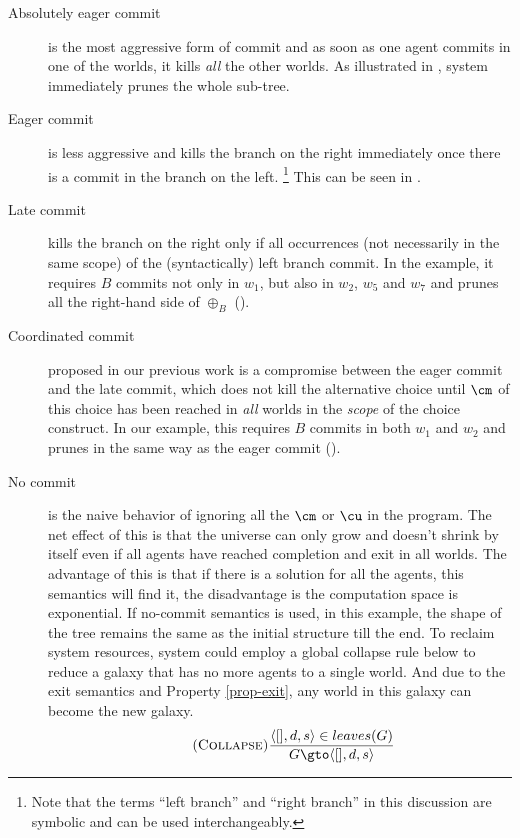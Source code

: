 \begin{description}
  \item[Absolutely eager commit] is the most aggressive form of commit and
as soon as one agent commits in one of the worlds,
it kills {\em all} the other worlds. As illustrated in
, system immediately prunes the whole sub-tree.

  \item[Eager commit] is less aggressive and kills the branch on the right
immediately once there is a commit in the branch on the left.
\footnote{Note that the terms ``left branch'' and ``right branch'' in this
discussion are symbolic and can be used interchangeably.}
This can be seen in .

  \item[Late commit] kills the branch on the right only if all occurrences
(not necessarily in the same scope) of the (syntactically) left branch commit.
In the example, it requires $B$ commits not only in $w_1$,
but also in $w_2$, $w_5$ and $w_7$ and prunes all the right-hand side of
$\oplus_B$ ().

  \item[Coordinated commit] proposed in our previous work \cite{JaffarYZ07}
is a compromise between the eager commit and the late commit, which does not
kill the alternative choice until $\cm$ of this choice has been reached in
\emph{all} worlds in the {\em scope} of the choice construct.
In our example, this requires $B$ commits in both $w_1$ and $w_2$ and prunes
in the same way as the eager commit ().

  \item[No commit] is the naive behavior of ignoring all the $\cm$ or $\cu$
in the program. The net effect of this is that the universe can only grow and
doesn't shrink by itself even if all agents have reached completion and exit in all worlds.
The advantage of this is that if there is a solution for all the agents, this semantics
will find it, the disadvantage is the computation space is exponential.
If no-commit semantics is used, in this example, the shape of the tree
remains the same as the initial structure till the end.
To reclaim system resources, system could employ a global collapse rule below
to reduce a galaxy that has no more agents to a single world. And due to the
exit semantics and Property \ref{prop-exit},
any world in this galaxy can become the new galaxy.
\[
    \tag{\sc Collapse}\label{rule:collapse}
    \frac
    {\langle [], d, s \rangle \in leaves(G) }
    {G \gto \langle [], d, s \rangle}
\]



\end{description}
